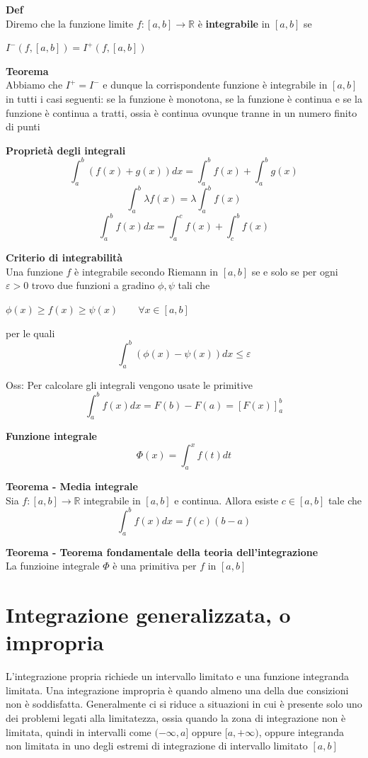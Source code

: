 \documentclass[12pt, a4paper]{article}
\begin{document}
\textbf{Def}\\Diremo che la funzione limite $f:[a,b]\to\mathbb{R}$ è \textbf{integrabile} in $[a,b]$ se
\begin{center}
    $I^{-}(f,[a,b])=I^{+}(f,[a,b])$
\end{center}

\textbf{Teorema}\\Abbiamo che $I^{+}=I^{-}$ e dunque la corrispondente funzione è integrabile in $[a,b]$ in tutti
i casi seguenti: se la funzione è monotona, se la funzione è continua e se la funzione è continua a tratti, ossia
è continua ovunque tranne in un numero finito di punti

\textbf{Proprietà degli integrali}
\[\int_{a}^{b}(f(x)+g(x))dx=\int_{a}^{b}f(x)+\int_{a}^{b}g(x)\]
\[\int_{a}^{b}\lambda f(x)=\lambda \int_{a}^{b}f(x)\]
\[\int_{a}^{b}f(x)dx=\int_{a}^{c}f(x)+\int_{c}^{b}f(x)\]

\textbf{Criterio di integrabilità}\\Una funzione $f$ è integrabile secondo Riemann in $[a,b]$ se e solo se per
ogni $\varepsilon>0$ trovo due funzioni a gradino $\phi,\psi$ tali che
\begin{center}
    $\phi(x)\geq f(x)\geq\psi(x)\qquad\forall x\in[a,b]$
\end{center}
per le quali \[\int_{a}^{b}(\phi(x)-\psi(x)) dx\leq\varepsilon\]

Oss: Per calcolare gli integrali vengono usate le primitive \[\int_{a}^{b}f(x)dx=F(b)-F(a)=[F(x)]^{b}_{a}\]

\textbf{Funzione integrale}\[\Phi(x)=\int_{a}^{x}f(t)dt \]

\textbf{Teorema - Media integrale}\\Sia $f:[a,b]\to\mathbb{R}$ integrabile in $[a,b]$ e continua.
Allora esiste $c\in[a,b]$ tale che \[\int_{a}^{b}f(x)dx=f(c)(b-a)\]

\textbf{Teorema - Teorema fondamentale della teoria dell'integrazione}\\La funzioine integrale $\Phi$ è una
primitiva per $f$ in $[a,b]$

\newpage
\section{Integrazione generalizzata, o impropria}
L'integrazione propria richiede un intervallo limitato e una funzione integranda limitata. Una integrazione
impropria è quando almeno una della due consizioni non è soddisfatta. Generalmente ci si riduce a situazioni
in cui è presente solo uno dei problemi legati alla limitatezza, ossia quando la zona di integrazione non è
limitata, quindi in intervalli come $(-\infty,a]$ oppure $[a,+\infty)$, oppure integranda non limitata in uno
degli estremi di integrazione di intervallo limitato $[a,b]$
\end{document}
